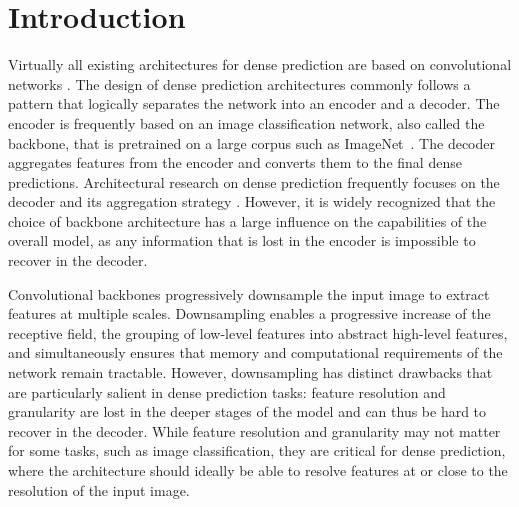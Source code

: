 \documentclass[10pt,twocolumn,letterpaper]{article}
\begin{document}
\section{Introduction}

Virtually all existing architectures for dense prediction are based on
convolutional networks
\cite{Shelhamer2015,Ronneberger2015,Yu2016,Chen2018deeplab,Zhao2016,Wang2020,Yuan2020}.
The design of dense prediction architectures commonly follows a pattern that
logically separates the network into an encoder and a decoder. The encoder is
frequently based on an image classification network, also called the backbone,
that is pretrained on a large corpus such as ImageNet~\cite{Deng2009}. The
decoder aggregates features from the encoder and converts them to the final
dense predictions. Architectural research on dense prediction frequently focuses
on the decoder and its aggregation strategy
\cite{Chen2017,Zhao2016,Yuan2020,Chen2018deeplab}. However, it is widely
recognized that the choice of backbone architecture has a large influence on the
capabilities of the overall model, as any information that is lost in the
encoder is impossible to recover in the decoder.

Convolutional backbones progressively downsample the input image to extract
features at multiple scales. Downsampling enables a progressive increase of the
receptive field, the grouping of low-level features into abstract high-level
features, and simultaneously ensures that memory and computational requirements
of the network remain tractable. However, downsampling has distinct drawbacks
that are particularly salient in dense prediction tasks: feature resolution and
granularity are lost in the deeper stages of the model and can thus be hard
to recover in the decoder. While feature resolution and granularity may not
matter for some tasks, such as image classification, they are critical for dense
prediction, where the architecture should ideally be able to resolve
features at or close to the resolution of the input image.
\end{document}
